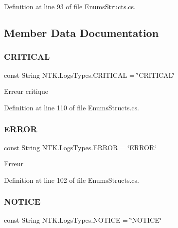 Definition at line 93 of file Enums\+Structs.\+cs.



\subsection{Member Data Documentation}
\mbox{\label{struct_n_t_k_1_1_logs_types_a5b6c1eb0dc3ca51711a5764da55b3d87}} 
\subsubsection{\texorpdfstring{CRITICAL}{CRITICAL}}
{\footnotesize\ttfamily const String N\+T\+K.\+Logs\+Types.\+C\+R\+I\+T\+I\+C\+AL = \char`\"{}C\+R\+I\+T\+I\+C\+AL\char`\"{}}



Erreur critique 



Definition at line 110 of file Enums\+Structs.\+cs.

\mbox{\label{struct_n_t_k_1_1_logs_types_a4fcc098f0702262b70b62ebb05c71c44}} 
\subsubsection{\texorpdfstring{ERROR}{ERROR}}
{\footnotesize\ttfamily const String N\+T\+K.\+Logs\+Types.\+E\+R\+R\+OR = \char`\"{}E\+R\+R\+OR\char`\"{}}



Erreur 



Definition at line 102 of file Enums\+Structs.\+cs.

\mbox{\label{struct_n_t_k_1_1_logs_types_a84af0b5f13ec7aa80a21658c5ae4d4fc}} 
\subsubsection{\texorpdfstring{NOTICE}{NOTICE}}
{\footnotesize\ttfamily const String N\+T\+K.\+Logs\+Types.\+N\+O\+T\+I\+CE = \char`\"{}N\+O\+T\+I\+CE\char`\"{}}



